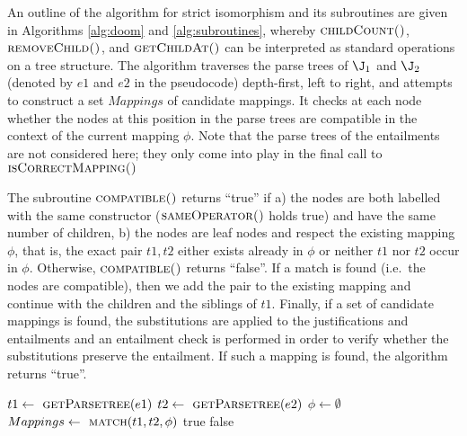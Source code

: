 An outline of the algorithm for strict isomorphism and its subroutines are given in Algorithms \ref{alg:doom} and \ref{alg:subroutines}, whereby  $\textsc{childCount()}$, $\textsc{removeChild()}$, and $\textsc{getChildAt()}$ can be interpreted as standard operations on a tree structure. The algorithm traverses the parse trees of $\J_{1}$ and $\J_{2}$ (denoted by $e1$ and $e2$ in the pseudocode) depth-first, left to right, and attempts to construct a set $Mappings$ of candidate mappings. It checks at each node whether the nodes at this position in the parse trees are compatible in the context of the current mapping $\phi$. Note that the parse trees of the entailments are not considered here; they only come into play in the final call to $\textsc{isCorrectMapping()}$

The subroutine $\textsc{compatible()}$ returns \enquote{true} if a) the nodes are both labelled with the same constructor  ($\textsc{sameOperator()}$ holds true) and have the same number of children, b) the nodes are leaf nodes and respect the existing mapping $\phi$, that is, the exact pair $t1, t2$ either exists already in $\phi$ or neither $t1$ nor $t2$ occur in $\phi$. Otherwise, $\textsc{compatible()}$ returns \enquote{false}. If a match is found (i.e.\ the nodes are compatible), then we add the pair to the existing mapping and continue with the children and the siblings of $t1$. Finally, if a set of candidate mappings is found, the substitutions are applied to the justifications and entailments and an entailment check is performed in order to verify whether the substitutions preserve the entailment. If such a mapping is found, the algorithm returns \enquote{true}.

\begin{algorithm}
\caption{$\textsc{ Equivalent}(e1, e2) $}
\begin{algorithmic}[1]               
	\State $ t1 \gets  \textsc{ getParsetree}(e1) $
	\State $ t2 \gets  \textsc{ getParsetree}(e2) $
	\State $ \phi \gets \emptyset$
    \State $ Mappings  \gets \textsc{ match}( t1, t2, \phi) $
				\State \Return true
			\EndIf
	\EndFor
	\State \Return false
\end{algorithmic}   
\label{alg:doom}                    
\end{algorithm}

